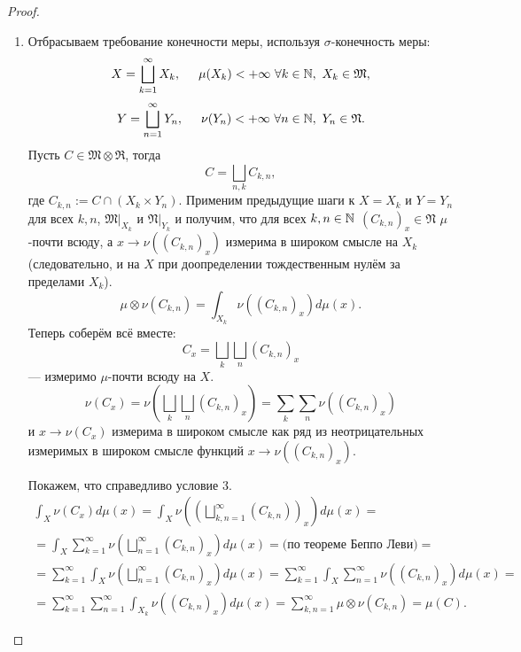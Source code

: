 \begin{proof}
\begin{enumerate}
        В силу предыдущих шагов $C_x \in \mathfrak{N}$ $\mu$-почти всюду (т.е. всюду на $X_0$) и $x \to \nu(C_x)$ измеримо в широком смысле на $X$ (в обычном смысле на $X$).
        \begin{multline*}
            \mu \otimes \nu(C)
            =
            \mu \otimes \nu(\widetilde{C})
            =
            \int_X \nu(\widetilde{C}_x) d\mu(x)
            =
            \int_X \nu(C_x)d\mu(x)
            =
            \int_{X_0}\nu(C_x)d\mu(x)
        \end{multline*} 
        \item Отбрасываем требование конечности меры, используя $\sigma$-конечность меры:
        \[X = \bigsqcup\limits_{k=1}^{\infty}X_k, \hspace*{.5cm} \mu(X_k) < +\infty \ \forall k \in \mathbb{N}, \ X_k \in \mathfrak{M},\]
        \[Y = \bigsqcup\limits_{n=1}^{\infty}Y_n, \hspace*{.5cm} \nu(Y_n) < +\infty \ \forall n \in \mathbb{N}, \ Y_n \in \mathfrak{N}.\]
        Пусть $C \in \mathfrak{M} \otimes \mathfrak{R}$, тогда
        \[C = \bigsqcup\limits_{n,k}C_{k,n},\]
        где $C_{k,n}:=C \cap (X_k \times Y_n)$.
        Применим предыдущие шаги к $X = X_k$ и $Y = Y_n$ для всех $k,n$, $\mathfrak{M}|_{X_k}$ и $\mathfrak{N}|_{Y_k}$ и получим, что для всех $k,n \in \mathbb{N}$ $(C_{k,n})_x \in \mathfrak{N}$ $\mu$-почти всюду, а $x \to \nu((C_{k,n})_x)$ измерима в широком смысле на $X_k$ (следовательно, и на $X$ при доопределении тождественным нулём за пределами $X_k$).
        \[\mu \otimes \nu(C_{k,n}) = \int_{X_k} \nu((C_{k,n})_x)d\mu(x).\]
        Теперь соберём всё вместе:
        \[C_x = \bigsqcup\limits_{k} \bigsqcup\limits_{n} (C_{k,n})_x\]
        — измеримо $\mu$-почти всюду на $X$.
        \[\nu(C_x) = \nu \left(\bigsqcup\limits_{k} \bigsqcup\limits_{n}(C_{k,n})_x\right) = \sum\limits_{k} \sum\limits_{n} \nu((C_{k,n})_x)\]
        и $x \to \nu(C_x)$ измерима в широком смысле как ряд из неотрицательных измеримых в широком смысле функций $x \to \nu((C_{k,n})_x)$.

        Покажем, что справедливо условие 3.
        \begin{multline*}
            \int_X \nu(C_x)d\mu(x)
            =
            \int_X \nu \left(\left(\bigsqcup\limits_{k,n=1}^{\infty}(C_{k,n})\right)_x\right)d\mu(x)
            =\\=
            \int_X \sum\limits_{k=1}^{\infty}\nu\left(\bigsqcup\limits_{n=1}^{\infty}(C_{k,n})_x\right)d\mu(x)
            =
            \text{(по теореме Беппо Леви)}
            =\\=
            \sum\limits_{k=1}^{\infty}\int_X \nu\left(\bigsqcup\limits_{n=1}^{\infty}(C_{k,n})_x\right)d\mu(x)
            =
            \sum\limits_{k=1}^{\infty}\int_X \sum\limits_{n=1}^{\infty} \nu((C_{k,n})_x)d\mu(x)
            =\\=
            \sum\limits_{k=1}^{\infty} \sum\limits_{n=1}^{\infty} \int_{X_k} \nu((C_{k,n})_x)d\mu(x)
            =
            \sum\limits_{k,n=1}^{\infty}\mu \otimes \nu(C_{k,n})
            =
            \mu(C). 
        \end{multline*} 
    \end{enumerate}
\end{proof} 


